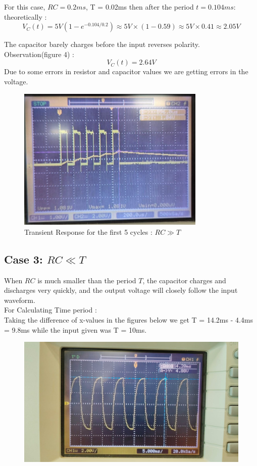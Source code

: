 \documentclass[a4paper,12pt]{article}
\begin{document}
For this case, \( RC = 0.2ms \), T = 0.02ms then after the period \( t = 0.104ms \):\\
theoretically :
\[
V_C\left(t\right) = 5V \left( 1 - e^{-0.104/0.2} \right) \approx 5V \times (1 - 0.59) \approx 5V \times 0.41 \approx 2.05V
\]

The capacitor barely charges before the input reverses polarity.\\

Observation(figure 4) : \\
\[
V_C(t) = 2.64V
\]
Due to some errors in resistor and capacitor values we are getting errors in the voltage. 
\begin{figure}[H]
    \centering
    \includegraphics[width=0.8\textwidth]{figs/rc>t_tr.jpeg}
    \caption{Transient Response for the first 5 cycles : \( RC \gg T \)}
\end{figure}

\subsection*{Case 3: \( RC \ll T \)}
When \( RC \) is much smaller than the period \( T \), the capacitor charges and discharges very quickly, and the output voltage will closely follow the input waveform.\\
For Calculating Time period :\\
Taking the difference of x-values in the figures below we get T = 14.2ms - 4.4ms = 9.8ms while the input given was T = 10ms.
\begin{figure}[H]
    \centering
    \includegraphics[width=\textwidth]{figs/rc<t_Time.jpeg}
\end{figure}
\end{document}
